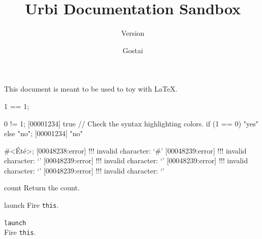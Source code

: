 \documentclass[openright,twoside,11pt]{book}
\title{Urbi Documentation Sandbox}
\subtitle{Version \VcsDescription}
\author{Gostai}
\begin{document}
This document is meant to be used to toy with \LaTeX{}.

\begin{urbiassert}[firstnumber=1]
1 == 1;
\end{urbiassert}

\begin{urbiscript}[firstnumber=last]
0 != 1;
[00001234] true
// Check the syntax highlighting colors.
if (1 == 0) "yes" else "no";
[00001234] "no"
\end{urbiscript}

\begin{urbiunchecked}[escapeinside=<>,firstnumber=last]
#<Été>;
[00048238:error] !!! invalid character: `#'
[00048239:error] !!! invalid character: `'
[00048239:error] !!! invalid character: `'
[00048239:error] !!! invalid character: `'
[00048239:error] !!! invalid character: `'
\end{urbiunchecked}



\begin{urbiscriptapi}
\item[count]Return the count.
\item[launch]
  Fire \lstinline|this|.
\item \lstinline|launch|~\\
  Fire \lstinline|this|.

\end{urbiscriptapi}
\end{document}

